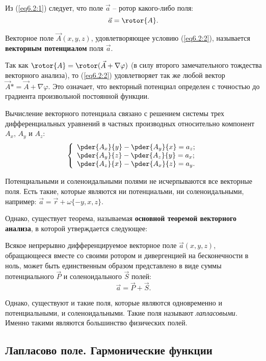 	Из (\ref{eq6.2:1}) следует, что поле \( \vec{a} \) -- ротор какого-либо поля:
	\begin{equation}
		\vec{a} = \rotor{A}. \label{eq6.2:2}
	\end{equation}
	
	\begin{definition}
	Векторное поле \( \vec{A}(x, y, z) \), удовлетворяющее условию (\ref{eq6.2:2}), называется \textbf{векторным потенциалом} поля \( \vec{a} \).
	\end{definition}
	
	Так как \( \rotor{A} = \rotor(\vec{A} + \nabla\varphi) \) (в силу второго замечательного тождества векторного анализа), то (\ref{eq6.2:2}) удовлетворяет так же любой вектор \( \vec{A}* = \vec{A} + \nabla\varphi \). Это означает, что векторный потенциал определен с точностью до градиента произвольной постоянной функции.
	
	Вычисление векторного потенциала связано с решением системы трех дифференциальных уравнений в частных производных относительно компонент \( A_x \), \( A_y \) и \( A_z \):
	\[ \left\{ \begin{array}{l}
		\pder{A_x}{y} - \pder{A_y}{x} = a_z; \\
		\pder{A_y}{z} - \pder{A_z}{y} = a_x; \\
		\pder{A_z}{x} - \pder{A_x}{z} = a_y.
	\end{array} \right. \]
	
	Потенциальными и соленоидальными полями не исчерпываются все векторные поля. Есть такие, которые являются ни потенциальми, ни соленоидальными, например: \( \vec{a} = \vec{r} + \omega\{ -y, x, z\} \).

	Однако, существует теорема, называемая \textbf{основной теоремой векторного анализа}, в которой утверждается следующее:
	\begin{theorem}
	Всякое непрерывно дифференцируемое векторное поле \( \vec{a}(x, y, z) \), обращающееся вместе со своими ротором и дивергенцией на бесконечности в ноль, может быть единственным образом представлено в виде суммы потенциального \( \vec{P} \) и соленоидального \( \vec{S} \) полей:
	\[ \vec{a} = \vec{P} + \vec{S}. \]
	\end{theorem}
	
	Однако, существуют и такие поля, которые являются одновременно и потенциальными, и соленоидальными. Такие поля называют \textit{лапласовыми}. Именно такими являются большинство физических полей.

\subsection{Лапласово поле. Гармонические функции}

